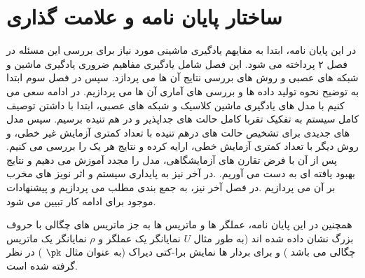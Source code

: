 \section{ساختار پایان نامه و علامت گذاری}





در این پایان نامه، ابتدا به مفایهم یادگیری ماشینی مورد نیاز برای بررسی این مسئله در فصل ۲ پرداخته می شود. این فصل شامل یادگیری  مفاهیم ضروری یادگیری ماشین و شبکه های عصبی و روش های بررسی نتایج آن ها می پردازد.
سپس در فصل سوم ابتدا به توضیح نحوه تولید داده ها و بررسی های آماری آن ها می پردازیم. در ادامه سعی می کنیم با مدل های یادگیری ماشین کلاسیک و شبکه های عصبی، ابتدا با داشتن توصیف کامل سیستم به تفکیک تقربا کامل حالت های جداپذیر و در هم تنیده برسیم. سپس مدل های جدیدی برای تشخیص حالت های درهم تنیده با تعداد کمتری آزمایش غیر خطی، و روش دیگر با تعداد کمتری آزمایش خطی، ارایه کرده و نتایج هر یک را بررسی می کنیم. پس از آن با فرض تقارن های آزمایشگاهی، مدل را مجدد آموزش می دهیم و نتایج بهبود یافته ای به دست می آوریم.
.در آخر نیز به پایداری سیستم و اثر نویز های مخرب بر آن می پردازیم
.در فصل آخر نیز، به جمع بندی مطلب می پردازیم و پیشنهادات موجود برای ادامه کار تبیین می شود.

همچنین در این پایان نامه، عملگر ها و ماتریس ها به جز ماتریس های چگالی با حروف بزرگ نشان داده شده اند  (به طور مثال
$U$
نمایانگر یک عملگر و
$\rho$
نمایانگر یک ماتریس چگالی می باشد
) و
برای بردار ها نمایش برا-کتی دیراک (به عنوان مثال
$\pk$
) در نظر گرفته شده است.
